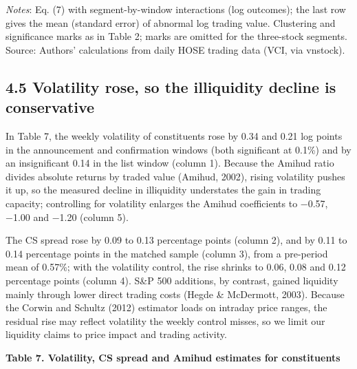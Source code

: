 \documentclass[review,authoryear,12pt]{elsarticle}
\begin{document}
\emph{Notes}: Eq. (7) with segment-by-window interactions (log
outcomes); the last row gives the mean (standard error) of abnormal log
trading value. Clustering and significance marks as in Table 2; marks
are omitted for the three-stock segments. Source: Authors' calculations
from daily HOSE trading data (VCI, via vnstock).

\hypertarget{volatility-rose-so-the-illiquidity-decline-is-conservative}{%
\subsection*{4.5 Volatility rose, so the illiquidity decline is
conservative}}

In Table 7, the weekly volatility of constituents rose by 0.34 and 0.21
log points in the announcement and confirmation windows (both
significant at 0.1\%) and by an insignificant 0.14 in the list window
(column 1). Because the Amihud ratio divides absolute returns by traded
value (Amihud, 2002), rising volatility pushes it up, so the measured
decline in illiquidity understates the gain in trading capacity;
controlling for volatility enlarges the Amihud coefficients to −0.57,
−1.00 and −1.20 (column 5).

The CS spread rose by 0.09 to 0.13 percentage points (column 2), and by
0.11 to 0.14 percentage points in the matched sample (column 3), from a
pre-period mean of 0.57\%; with the volatility control, the rise shrinks
to 0.06, 0.08 and 0.12 percentage points (column 4). S\&P 500 additions,
by contrast, gained liquidity mainly through lower direct trading costs
(Hegde \& McDermott, 2003). Because the Corwin and Schultz (2012)
estimator loads on intraday price ranges, the residual rise may reflect
volatility the weekly control misses, so we limit our liquidity claims
to price impact and trading activity.

\textbf{Table 7. Volatility, CS spread and Amihud estimates for
constituents}
\end{document}
